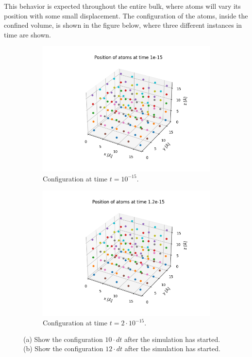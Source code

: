 \documentclass[a4paper]{article}
\begin{document}
This behavior is expected throughout the entire bulk, where atoms will vary its position with some small displacement.
The configuration of the atoms, inside the confined volume, is shown in the figure below, where three different instances in time are shown.
\begin{figure}[H]
    \centering
    \begin{subfigure}[b]{0.45\textwidth}
        \centering
        \includegraphics[width=\textwidth]{conf_15.png}
        \caption{Configuration at time $t = 10^{-15}$.}
        \label{fig: Configuration 1}
    \end{subfigure}
    \hfill
    \begin{subfigure}[b]{0.45\textwidth}
        \centering
        \includegraphics[width=\textwidth]{conf_2_15.png}
        \caption{Configuration at time $t = 2\cdot10^{-15}$.}
        \label{fig: Configuration 2 }
    \end{subfigure}
    \caption{(a) Show the configuration $10\cdot dt$ after the simulation has started. (b) Show the configuration $12\cdot dt$ after the simulation has started.}
    \label{fig: Configuration gas}
\end{figure}\noindent
\end{document}
